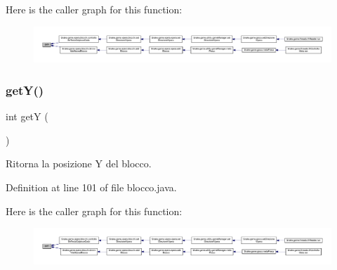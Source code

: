 Here is the caller graph for this function\+:
\nopagebreak
\begin{figure}[H]
\begin{center}
\leavevmode
\includegraphics[width=350pt]{class_snake_1_1game_1_1vipera_1_1blocco_ae13f88e922e1339355456062ad9fa359_icgraph}
\end{center}
\end{figure}
\mbox{\label{class_snake_1_1game_1_1vipera_1_1blocco_aab81944f0a14bba932c0931899951937}} 
\subsubsection{\texorpdfstring{get\+Y()}{getY()}}
{\footnotesize\ttfamily int getY (\begin{DoxyParamCaption}{ }\end{DoxyParamCaption})}



Ritorna la posizione Y del blocco. 



Definition at line 101 of file blocco.\+java.

Here is the caller graph for this function\+:
\nopagebreak
\begin{figure}[H]
\begin{center}
\leavevmode
\includegraphics[width=350pt]{class_snake_1_1game_1_1vipera_1_1blocco_aab81944f0a14bba932c0931899951937_icgraph}
\end{center}
\end{figure}
\mbox{\label{class_snake_1_1game_1_1vipera_1_1blocco_acabc02ee9509cd1e196033348dd76a6f}} 

